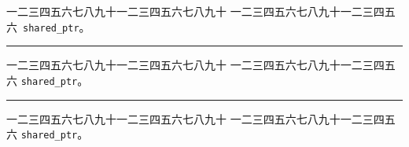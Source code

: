 \documentclass[10pt,adobefonts,fancyhdr,UTF8]{ctexbook}
\begin{document}
\pagestyle{empty}
\mbox{}
\newpage
\noindent{}%
一二三四五六七八九十一二三四五六七八九十
\mbox{一二三四五六七八九十一二三四五六
\texttt{shared_ptr}。}

\vspace{1ex}
\hrule

\noindent{}%
一二三四五六七八九十一二三四五六七八九十\linebreak
一二三四五六七八九十一二三四五六\linebreak
\texttt{shared_ptr}。

\vspace{1ex}
\hrule

\noindent\marginpar[\hfill \TeX]{}%
一二三四五六七八九十一二三四五六七八九十
一二三四五六七八九十一二三四五六
\texttt{shared_ptr}。
\end{document}
